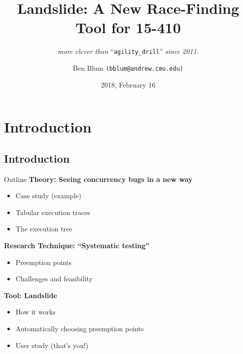 \documentclass[xcolor=dvipsnames]{beamer}
\title[Landslide]{{\bf Landslide: A New Race-Finding Tool for 15-410}}
\subtitle[]{ {\em more clever than } ``\texttt{agility\_drill}'' {\em since 2011.}}
\author[Ben Blum]{Ben Blum \texttt{(bblum@andrew.cmu.edu)}}
\institute[CMU 15-410]{Carnegie Mellon University - 15-410}
\date[]{2018, February 16}
\begin{document}
\renewcommand{\inserttotalframenumber}{38}
\normalem
\begin{frame}
	\titlepage
\end{frame}


\newcommand\linegap{\vspace{0.2in}}
\newcommand\breakslide[1]{\begin{frame}{} \begin{center} #1 \end{center} \end{frame}}

\section{Introduction}
\subsection{Introduction}

\begin{frame}{Outline}
	\textbf{Theory: Seeing concurrency bugs in a new way}
	\begin{itemize}
		\item Case study (example)
		\item Tabular execution traces
		\item The execution tree
	\end{itemize}
	{\bf Research Technique: ``Systematic testing''}
	\begin{itemize}
		\item Preemption points
		\item Challenges and feasibility
	\end{itemize}
	{\bf Tool: Landslide}
	\begin{itemize}
		\item How it works
		\item Automatically choosing preemption points
		\item User study (that's you!)
	\end{itemize}
\end{frame}
\end{document}
